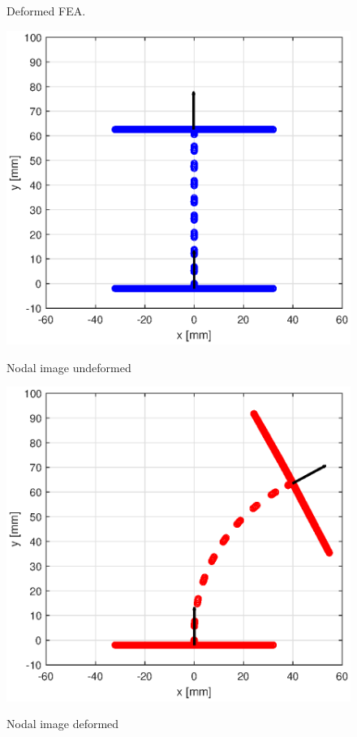 \begin{figure}[H]
\begin{minipage}[b]{0.5\linewidth}
    \caption{Deformed FEA.} 
    \vspace{4ex}
    \label{fig3:FEMdef} 
  \end{minipage} 
  \begin{minipage}[b]{0.5\linewidth}
    \centering
    \includegraphics[width=\linewidth]{Figures/Chapter2/undeformednodal.eps} 
    \caption{Nodal image undeformed} 
    \vspace{4ex}
    \label{fig3:MATun} 
  \end{minipage}%
  \begin{minipage}[b]{0.5\linewidth}
    \centering
    \includegraphics[width=\linewidth]{Figures/Chapter2/deformednodal.eps} 
    \caption{Nodal image deformed } 
    \vspace{4ex}
    \label{fig3:MATdef} 
  \end{minipage} 
\end{figure}

